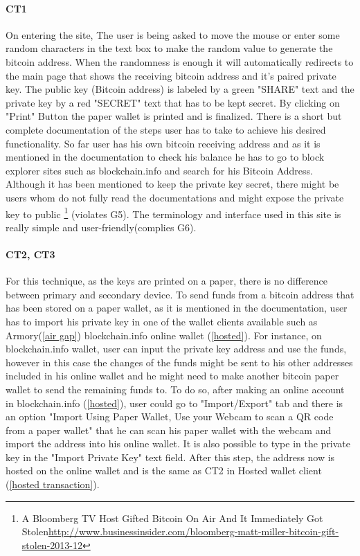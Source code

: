 \paragraph{CT1} On entering the site, The user is being asked to move the mouse or enter some random characters in the text box to make the random value to generate the bitcoin address. When the randomness is enough it will automatically redirects to the main page that shows the receiving bitcoin address and it's paired private key. The public key (Bitcoin address) is labeled by a green "SHARE" text and the private key by a red "SECRET" text that has to be kept secret. By clicking on "Print" Button the paper wallet is printed and is finalized. There is a short but complete documentation of the steps user has to take to achieve his desired functionality. So far user has his own bitcoin receiving address and as it is mentioned in the documentation to check his balance he has to go to block explorer sites such as blockchain.info and search for his Bitcoin Address. Although it has been mentioned to keep the private key secret, there might be users whom do not fully read the documentations and might expose the private key to public \footnote{A Bloomberg TV Host Gifted Bitcoin On Air And It Immediately Got Stolen\url{http://www.businessinsider.com/bloomberg-matt-miller-bitcoin-gift-stolen-2013-12}} (violates G5). The terminology and interface used in this site is really simple and user-friendly(complies G6).

\paragraph{CT2, CT3} For this technique, as the keys are printed on a paper, there is no difference between primary and secondary device.
To send funds from a bitcoin address that has been stored on a paper wallet, as it is mentioned in the documentation, user has to import his private key in one of the wallet clients available such as Armory(\ref{air gap}) blockchain.info online wallet (\ref{hosted}). For instance, on blockchain.info wallet, user can input the private key address and use the funds, however in this case the changes of the funds might be sent to his other addresses included in his online wallet and he might need to make another bitcoin paper wallet to send the remaining funds to. To do so, after making an online account in blockchain.info (\ref{hosted}), user could go to "Import/Export" tab and there is an option "Import Using Paper Wallet, Use your Webcam to scan a QR code from a paper wallet" that he can scan his paper wallet with the webcam and import the address into his online wallet. It is also possible to type in the private key in the "Import Private Key" text field. After this step, the address now is hosted on the online wallet and is the same as CT2 in Hosted wallet client (\ref{hosted transaction}).

